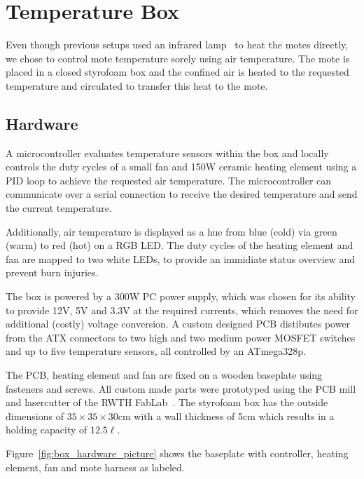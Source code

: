 \section{Temperature Box}
\label{sec:temperature_box}

Even though previous setups used an infrared lamp~\cite{Boano2013, Hermans2013} to heat the motes directly, we chose to control mote temperature sorely using air temperature.
The mote is placed in a closed styrofoam box and the confined air is heated to the requested temperature and circulated to transfer this heat to the mote.

\subsection{Hardware}
A microcontroller evaluates temperature sensors within the box and locally controls the duty cycles of a small fan and 150W ceramic heating element using a PID loop to achieve the requested air temperature.
The microcontroller can communicate over a serial connection to receive the desired temperature and send the current temperature.

Additionally, air temperature is displayed as a hue from blue (cold) via green (warm) to red (hot) on a RGB LED.
The duty cycles of the heating element and fan are mapped to two white LEDs, to provide an immidiate status overview and prevent burn injuries.

The box is powered by a 300W PC power supply, which was chosen for its ability to provide 12V, 5V and 3.3V at the required currents, which removes the need for additional (costly) voltage conversion.
A custom designed PCB distibutes power from the ATX connectors to two high and two medium power MOSFET switches and up to five temperature sensors, all controlled by an ATmega328p.

The PCB, heating element and fan are fixed on a wooden baseplate using fasteners and screws.
All custom made parts were prototyped using the PCB mill and lasercutter of the RWTH FabLab~\cite{fablab}.
The styrofoam box has the outside dimensions of $35 \times 35 \times 30$cm with a wall thickness of 5cm which results in a holding capacity of $12.5\ell$.

Figure~\ref{fig:box_hardware_picture} shows the baseplate with controller, heating element, fan and mote harness as labeled.

